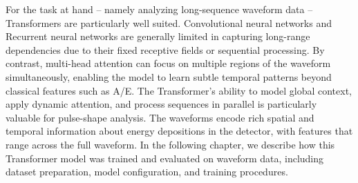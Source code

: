 For the task at hand -- namely analyzing long-sequence waveform data -- Transformers are particularly well suited. Convolutional neural networks and Recurrent neural networks are generally limited in capturing long-range dependencies due to their fixed receptive fields or sequential processing. By contrast, multi-head attention can focus on multiple regions of the waveform simultaneously, enabling the model to learn subtle temporal patterns beyond classical features such as A/E. The Transformer's ability to model global context, apply dynamic attention, and process sequences in parallel is particularly valuable for pulse-shape analysis. The waveforms encode rich spatial and temporal information about energy depositions in the detector, with features that range across the full waveform. 
In the following chapter, we describe how this Transformer model was trained and evaluated on waveform data, including dataset preparation, model configuration, and training procedures. 



